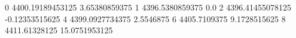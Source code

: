 0 4400.19189453125 3.65380859375
1 4396.5380859375 0.0
2 4396.41455078125 -0.12353515625
4 4399.0927734375 2.5546875
6 4405.7109375 9.1728515625
8 4411.61328125 15.0751953125
